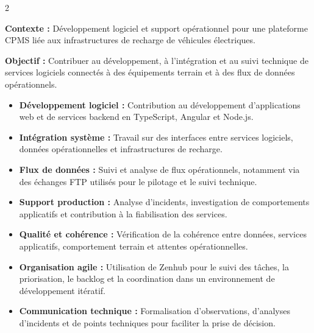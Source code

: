 \documentclass[8pt,a4paper,ragged2e,withhyper]{../_shared/altacv}
\begin{document}



\makecvheader
\vspace{-0.3cm}


\begin{paracol}{2}



\textbf{Contexte :} Développement logiciel et support opérationnel pour une plateforme CPMS liée aux infrastructures de recharge de véhicules électriques.

\textbf{Objectif :} Contribuer au développement, à l'intégration et au suivi technique de services logiciels connectés à des équipements terrain et à des flux de données opérationnels.

\begin{itemize}
  \item \textbf{Développement logiciel :} Contribution au développement d'applications web et de services backend en TypeScript, Angular et Node.js.
  \item \textbf{Intégration système :} Travail sur des interfaces entre services logiciels, données opérationnelles et infrastructures de recharge.
  \item \textbf{Flux de données :} Suivi et analyse de flux opérationnels, notamment via des échanges FTP utilisés pour le pilotage et le suivi technique.
  \item \textbf{Support production :} Analyse d'incidents, investigation de comportements applicatifs et contribution à la fiabilisation des services.
  \item \textbf{Qualité et cohérence :} Vérification de la cohérence entre données, services applicatifs, comportement terrain et attentes opérationnelles.
  \item \textbf{Organisation agile :} Utilisation de Zenhub pour le suivi des tâches, la priorisation, le backlog et la coordination dans un environnement de développement itératif.
  \item \textbf{Communication technique :} Formalisation d'observations, d'analyses d'incidents et de points techniques pour faciliter la prise de décision.
\end{itemize}


\end{paracol}
\end{document}
